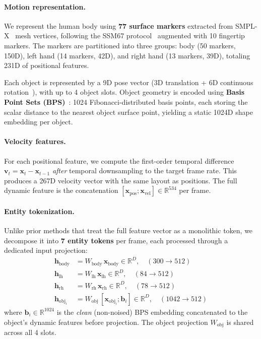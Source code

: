 \paragraph{Motion representation.}
We represent the human body using \textbf{77 surface markers} extracted from SMPL-X~\cite{pavlakos2019expressive} mesh vertices, following the SSM67 protocol~\cite{interact2024} augmented with 10 fingertip markers. The markers are partitioned into three groups: body (50 markers, 150D), left hand (14 markers, 42D), and right hand (13 markers, 39D), totaling 231D of positional features.

Each object is represented by a 9D pose vector (3D translation + 6D continuous rotation~\cite{zhou2019continuity}), with up to 4 object slots. Object geometry is encoded using \textbf{Basis Point Sets (BPS)}~\cite{prokudin2019efficient}: 1024 Fibonacci-distributed basis points, each storing the scalar distance to the nearest object surface point, yielding a static 1024D shape embedding per object.

\paragraph{Velocity features.}
For each positional feature, we compute the first-order temporal difference $\mathbf{v}_t = \mathbf{x}_t - \mathbf{x}_{t-1}$ \emph{after} temporal downsampling to the target frame rate. This produces a 267D velocity vector with the same layout as positions. The full dynamic feature is the concatenation $[\mathbf{x}_{\text{pos}}; \mathbf{x}_{\text{vel}}] \in \mathbb{R}^{534}$ per frame.

\paragraph{Entity tokenization.}
Unlike prior methods that treat the full feature vector as a monolithic token, we decompose it into \textbf{7 entity tokens} per frame, each processed through a dedicated input projection:
\begin{align}
    \mathbf{h}_{\text{body}} &= W_{\text{body}} \, \mathbf{x}_{\text{body}} \in \mathbb{R}^D, \quad (300 \rightarrow 512) \\
    \mathbf{h}_{\text{lh}} &= W_{\text{lh}} \, \mathbf{x}_{\text{lh}} \in \mathbb{R}^D, \quad (84 \rightarrow 512) \\
    \mathbf{h}_{\text{rh}} &= W_{\text{rh}} \, \mathbf{x}_{\text{rh}} \in \mathbb{R}^D, \quad (78 \rightarrow 512) \\
    \mathbf{h}_{\text{obj}_i} &= W_{\text{obj}} \, [\mathbf{x}_{\text{obj}_i}; \mathbf{b}_i] \in \mathbb{R}^D, \quad (1042 \rightarrow 512)
    \label{eq:entity_proj}
\end{align}
where $\mathbf{b}_i \in \mathbb{R}^{1024}$ is the \emph{clean} (non-noised) BPS embedding concatenated to the object's dynamic features before projection. The object projection $W_{\text{obj}}$ is shared across all 4 slots.

